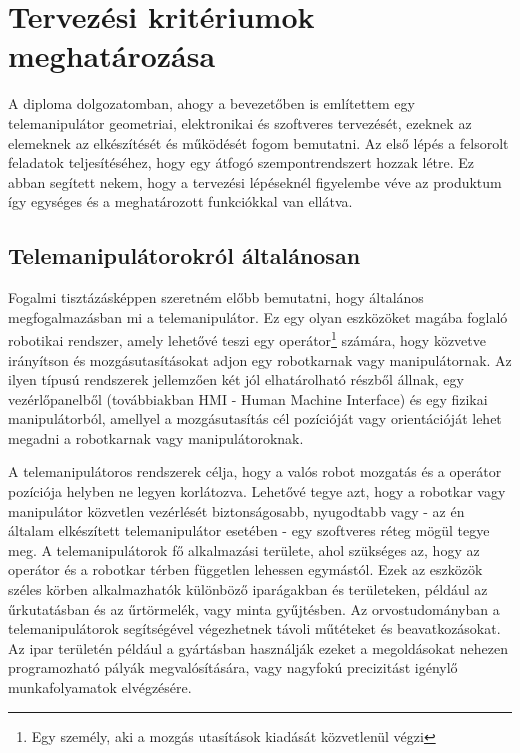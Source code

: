 \chapter{Tervezési kritériumok meghatározása}
\label{sec:Tervezesi_kriteriumok}

A diploma dolgozatomban, ahogy a bevezetőben is említettem egy telemanipulátor geometriai, elektronikai és szoftveres tervezését, ezeknek az elemeknek az elkészítését és működését fogom bemutatni. Az első lépés a felsorolt feladatok teljesítéséhez, hogy egy átfogó szempontrendszert hozzak létre. Ez abban segített nekem, hogy a tervezési lépéseknél figyelembe véve az produktum így egységes és a meghatározott funkciókkal van ellátva.  

\section{Telemanipulátorokról általánosan}

Fogalmi tisztázásképpen szeretném előbb bemutatni, hogy általános megfogalmazásban mi a telemanipulátor. Ez egy olyan eszközöket magába foglaló robotikai rendszer, amely lehetővé teszi egy operátor\footnote{Egy személy, aki a mozgás utasítások kiadását közvetlenül végzi} számára, hogy közvetve irányítson és mozgásutasításokat adjon egy robotkarnak vagy manipulátornak. Az ilyen típusú rendszerek jellemzően két jól elhatárolható részből állnak, egy vezérlőpanelből (továbbiakban HMI - Human Machine Interface) és egy fizikai manipulátorból, amellyel a mozgásutasítás cél pozícióját vagy orientációját lehet megadni a robotkarnak vagy manipulátoroknak.

A telemanipulátoros rendszerek célja, hogy a valós robot mozgatás és a operátor pozíciója helyben ne legyen korlátozva. Lehetővé tegye azt, hogy a robotkar vagy manipulátor közvetlen vezérlését biztonságosabb, nyugodtabb vagy - az én általam elkészített telemanipulátor esetében - egy szoftveres réteg mögül tegye meg. A telemanipulátorok fő alkalmazási területe, ahol szükséges az, hogy az operátor és a robotkar térben független lehessen egymástól. Ezek az eszközök széles körben alkalmazhatók különböző iparágakban és területeken, például az űrkutatásban és az űrtörmelék, vagy minta gyűjtésben. Az orvostudományban a telemanipulátorok segítségével végezhetnek távoli műtéteket és beavatkozásokat. Az ipar területén például a gyártásban használják ezeket a megoldásokat nehezen programozható pályák megvalósítására, vagy nagyfokú precizitást igénylő munkafolyamatok elvégzésére.

